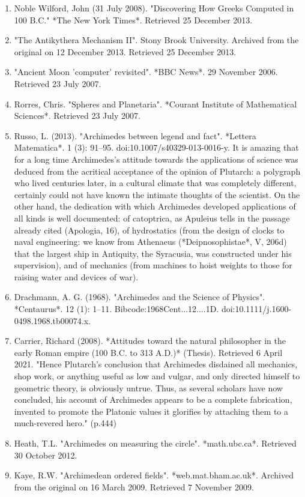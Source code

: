 \begin{enumerate}
\item Noble Wilford, John (31 July 2008). "Discovering How Greeks Computed in 100 B.C." *The New York Times*. Retrieved 25 December 2013.
\item "The Antikythera Mechanism II". Stony Brook University. Archived from the original on 12 December 2013. Retrieved 25 December 2013.
\item "Ancient Moon 'computer' revisited". *BBC News*. 29 November 2006. Retrieved 23 July 2007.
\item Rorres, Chris. "Spheres and Planetaria". *Courant Institute of Mathematical Sciences*. Retrieved 23 July 2007.
\item Russo, L. (2013). "Archimedes between legend and fact". *Lettera Matematica*. 1 (3): 91–95. doi:10.1007/s40329-013-0016-y. It is amazing that for a long time Archimedes's attitude towards the applications of science was deduced from the acritical acceptance of the opinion of Plutarch: a polygraph who lived centuries later, in a cultural climate that was completely different, certainly could not have known the intimate thoughts of the scientist. On the other hand, the dedication with which Archimedes developed applications of all kinds is well documented: of catoptrica, as Apuleius tells in the passage already cited (Apologia, 16), of hydrostatics (from the design of clocks to naval engineering: we know from Athenaeus (*Deipnosophistae*, V, 206d) that the largest ship in Antiquity, the Syracusia, was constructed under his supervision), and of mechanics (from machines to hoist weights to those for raising water and devices of war).
\item Drachmann, A. G. (1968). "Archimedes and the Science of Physics". *Centaurus*. 12 (1): 1–11. Bibcode:1968Cent...12....1D. doi:10.1111/j.1600-0498.1968.tb00074.x.
\item Carrier, Richard (2008). *Attitudes toward the natural philosopher in the early Roman empire (100 B.C. to 313 A.D.)* (Thesis). Retrieved 6 April 2021. "Hence Plutarch's conclusion that Archimedes disdained all mechanics, shop work, or anything useful as low and vulgar, and only directed himself to geometric theory, is obviously untrue. Thus, as several scholars have now concluded, his account of Archimedes appears to be a complete fabrication, invented to promote the Platonic values it glorifies by attaching them to a much-revered hero." (p.444)
\item Heath, T.L. "Archimedes on measuring the circle". *math.ubc.ca*. Retrieved 30 October 2012.
\item Kaye, R.W. "Archimedean ordered fields". *web.mat.bham.ac.uk*. Archived from the original on 16 March 2009. Retrieved 7 November 2009.

\end{enumerate}
